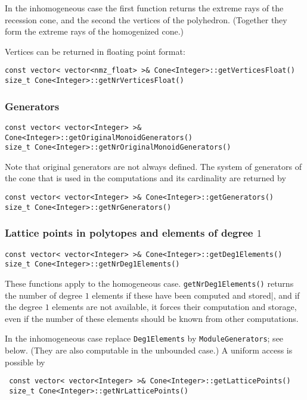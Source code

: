 \documentclass[12pt,a4paper]{scrartcl}
\theoremstyle{definition}
\begin{document}
\begin{small}
In the inhomogeneous case the first function returns the extreme rays of the recession cone, and the second the vertices of the polyhedron. (Together they form the extreme rays of the homogenized cone.)

Vertices can be returned in floating point format:
\begin{Verbatim}
const vector< vector<nmz_float> >& Cone<Integer>::getVerticesFloat()
size_t Cone<Integer>::getNrVerticesFloat()
\end{Verbatim}

\subsubsection{Generators}

\begin{Verbatim}
const vector< vector<Integer> >& Cone<Integer>::getOriginalMonoidGenerators()
size_t Cone<Integer>::getNrOriginalMonoidGenerators()
\end{Verbatim}
Note that original generators are not always defined. The system of generators of the cone that is used in the computations and its cardinality are returned by
\begin{Verbatim}
const vector< vector<Integer> >& Cone<Integer>::getGenerators()
size_t Cone<Integer>::getNrGenerators()
\end{Verbatim}

\subsubsection{Lattice points in polytopes and elements of degree $1$}

\begin{Verbatim}
const vector< vector<Integer> >& Cone<Integer>::getDeg1Elements()
size_t Cone<Integer>::getNrDeg1Elements()
\end{Verbatim}
These functions apply to the homogeneous case. \verb|getNrDeg1Elements()| returns the number of degree $1$ elements if these have been computed and stored|, and if the degree $1$ elements are not available, it forces their computation and storage, even if the number of these elements should be known from other computations.

In the inhomogeneous case replace \verb|Deg1Elements| by \verb|ModuleGenerators|;  see below. (They are also computable in the unbounded case.)  A uniform access is possible by
 \begin{Verbatim}
 const vector< vector<Integer> >& Cone<Integer>::getLatticePoints()
 size_t Cone<Integer>::getNrLatticePoints()
 \end{Verbatim} 
 

\end{small}
\end{document}
